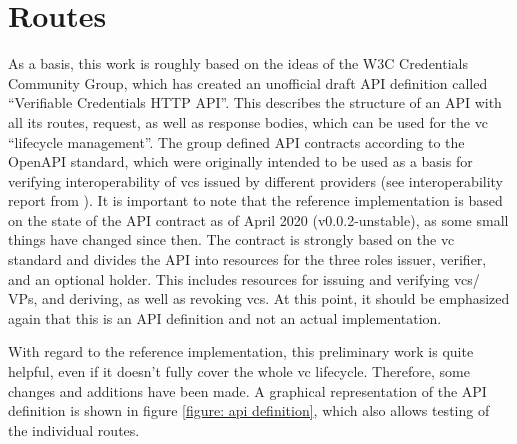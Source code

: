    \section{Routes}
    
    As a basis, this work is roughly based on the ideas of the W3C Credentials Community Group, which has created an unofficial draft API definition called “Verifiable Credentials HTTP API”. This describes the structure of an API with all its routes, request, as well as response bodies, which can be used for the \ac{vc} “lifecycle management”. The group defined API contracts according to the OpenAPI standard, which were originally intended to be used as a basis for verifying interoperability of \acp{vc} issued by different providers (see interoperability report from \cite{homeland_security_preventing_2020}). It is important to note that the reference implementation is based on the state of the API contract as of April 2020 (v0.0.2-unstable), as some small things have changed since then. The contract is strongly based on the \ac{vc} standard and divides the API into resources for the three roles issuer, verifier, and an optional holder. This includes resources for issuing and verifying \acp{vc}/ \acp{VP}, and deriving, as well as revoking \acp{vc}. At this point, it should be emphasized again that this is an API definition and not an actual implementation. \cite{world_wide_web_consortium_credentials_community_group_vc_2021, world_wide_web_consortium_credentials_community_group_verifiable_2021}
    
    With regard to the reference implementation, this preliminary work is quite helpful, even if it doesn't fully cover the whole \ac{vc} lifecycle. Therefore, some changes and additions have been made. A graphical representation of the API definition is shown in figure \ref{figure: api definition}, which also allows testing of the individual routes.
    
